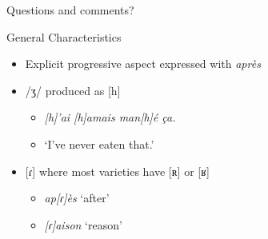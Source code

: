 \documentclass{beamer}\usepackage[]{graphicx}\usepackage[]{color}
\newcommand{\lexi}[1]{\textit{#1}}
\newcommand{\gloss}[1]{`#1'}
\begin{document}
    \begin{frame}{}
      \begin{center}
        Questions and comments?
      \end{center}
    \end{frame}

    \begin{frame}{General Characteristics}
      \begin{itemize}
        \item Explicit progressive aspect expressed with \lexi{après} \parencite{papen_structural_1997}
        \item /ʒ/ produced as [h] \parencite{carmichael_language_2019}
        \begin{itemize}
          \item \lexi{[h]'ai [h]amais man[h]é ça.}
          \item \gloss{I've never eaten that.}
        \end{itemize}
        \item {}[ɾ] where most varieties have [ʀ] or [ʁ] \parencite{blainey_first_2013}
        \begin{itemize}
          \item \lexi{ap[ɾ]ès} \gloss{after}
          \item \lexi{[ɾ]aison} \gloss{reason}
        \end{itemize}
      \end{itemize}
    \end{frame}
\end{document}

